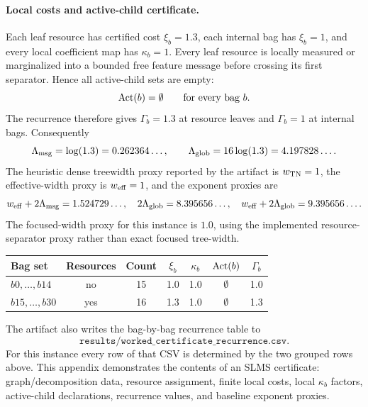 \paragraph{Local costs and active-child certificate.}
Each leaf resource has certified cost \(\xi_b=1.3\), each internal bag has \(\xi_b=1\), and every local coefficient map has \(\kappa_b=1\). Every leaf resource is locally measured or marginalized into a bounded free feature message before crossing its first separator. Hence all active-child sets are empty:
\[
\operatorname{Act}(b)=\emptyset\qquad\text{for every bag }b.
\]
The recurrence therefore gives \(\Gamma_b=1.3\) at resource leaves and \(\Gamma_b=1\) at internal bags. Consequently
\[
\Lambda_{\mathrm{msg}}=\log(1.3)=0.262364\ldots,
\qquad
\Lambda_{\mathrm{glob}}=16\log(1.3)=4.197828\ldots .
\]
The heuristic dense treewidth proxy reported by the artifact is \(w_{\mathrm{TN}}=1\), the effective-width proxy is \(w_{\mathrm{eff}}=1\), and the exponent proxies are
\[
w_{\mathrm{eff}}+2\Lambda_{\mathrm{msg}}=1.524729\ldots,
\quad
2\Lambda_{\mathrm{glob}}=8.395656\ldots,
\quad
w_{\mathrm{eff}}+2\Lambda_{\mathrm{glob}}=9.395656\ldots .
\]
The focused-width proxy for this instance is \(1.0\), using the implemented resource-separator proxy rather than exact focused tree-width.

\begin{center}
\small
\begin{tabular}{lcccccc}
\toprule
Bag set & Resources & Count & \(\xi_b\) & \(\kappa_b\) & \(\operatorname{Act}(b)\) & \(\Gamma_b\) \\
\midrule
\(b0,\ldots,b14\) & no & 15 & 1.0 & 1.0 & \(\emptyset\) & 1.0 \\
\(b15,\ldots,b30\) & yes & 16 & 1.3 & 1.0 & \(\emptyset\) & 1.3 \\
\bottomrule
\end{tabular}
\end{center}

The artifact also writes the bag-by-bag recurrence table to
\[
\texttt{results/worked\_certificate\_recurrence.csv}.
\]
For this instance every row of that CSV is determined by the two grouped rows above. This appendix demonstrates the contents of an SLMS certificate: graph/decomposition data, resource assignment, finite local costs, local \(\kappa_b\) factors, active-child declarations, recurrence values, and baseline exponent proxies.
